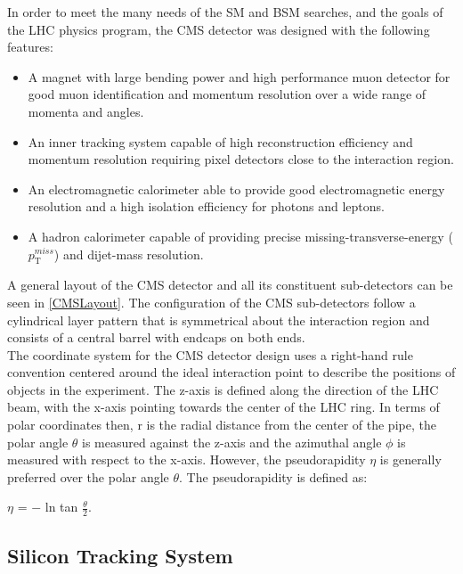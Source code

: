 In order to meet the many needs of the SM and BSM searches, and the goals of the LHC physics program, the CMS detector was designed with the following features:\\
\begin{itemize}
	\itemsep-1em
	\item{A magnet with large bending power and high performance muon detector for good muon identification and momentum resolution over a wide range of momenta and angles.}\\
	\item{An inner tracking system capable of high reconstruction efficiency and momentum resolution requiring pixel detectors close to the interaction region.}\\
	\item{An electromagnetic calorimeter able to provide good electromagnetic energy resolution and a high isolation efficiency for photons and leptons.}\\
	\item{A hadron calorimeter capable of providing precise missing-transverse-energy ($p_\text{T}^{miss}$)  and dijet-mass resolution.}\\
\end{itemize}

A general layout of the CMS detector and all its constituent sub-detectors can be seen in \autoref{CMSLayout}. The configuration of the CMS sub-detectors follow a cylindrical layer pattern that is symmetrical about the interaction region and consists of a central barrel with endcaps on both ends.\\

The coordinate system for the CMS detector design uses a right-hand rule convention centered around the ideal interaction point to describe the positions of objects in the experiment. The z-axis is defined along the direction of the LHC beam, with the x-axis pointing towards the center of the LHC ring. In terms of polar coordinates then, r is the radial distance from the center of the pipe, the polar angle $\theta$ is measured against the z-axis and the azimuthal angle $\phi$ is measured with respect to the x-axis. However, the pseudorapidity $\eta$ is generally preferred over the polar angle $\theta$. The pseudorapidity is defined as:

\begin{center}
$\eta$ =  $-$ ln tan $\frac{\theta}{2}$.
\end{center}

\subsection{Silicon Tracking System}

